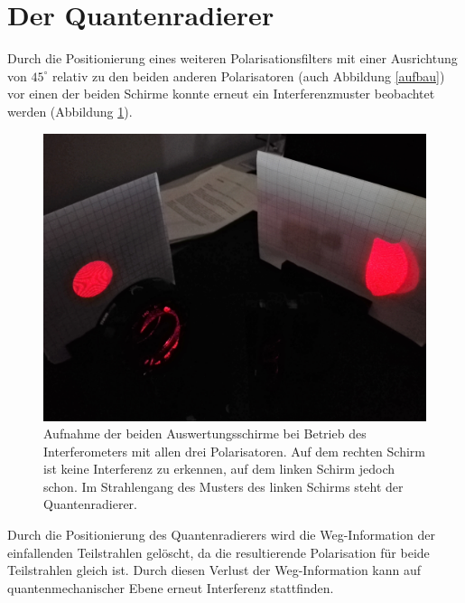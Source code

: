 \documentclass{include/thesisclass3}
\begin{document}
\section{Der Quantenradierer}
Durch die Positionierung eines weiteren Polarisationsfilters  mit einer Ausrichtung von $45^\circ$ relativ zu den beiden anderen Polarisatoren (auch Abbildung \ref{aufbau}) vor einen der beiden Schirme konnte erneut ein Interferenzmuster beobachtet werden (Abbildung \ref{qrazge}).
\begin{figure}[H]
\centering
\includegraphics[scale=0.1]{images/radiert.jpg}
\caption{Aufnahme der beiden Auswertungsschirme bei Betrieb des Interferometers mit allen drei Polarisatoren. Auf dem rechten Schirm ist keine Interferenz zu erkennen, auf dem linken Schirm jedoch schon. Im Strahlengang des Musters des linken Schirms steht der Quantenradierer.}
\label{qrazge}
\end{figure}
Durch die Positionierung des Quantenradierers wird die Weg-Information der einfallenden Teilstrahlen gelöscht, da die resultierende Polarisation für beide Teilstrahlen gleich ist. Durch diesen Verlust der Weg-Information kann auf quantenmechanischer Ebene erneut Interferenz stattfinden.
\end{document}
